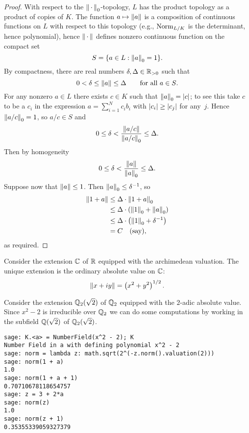 \begin{proof}
With respect to the $\left\|\,\cdot\,\right\|_0$-topology, $L$ has the product topology
as a product of copies of $K$.  The
function $a\mapsto \left\|a\right\|$ is a composition of continuous functions on $L$
with respect to this topology (e.g., $\operatorname{Norm}_{L/K}$ is the determinant, hence
polynomial),
hence $\left\|\,\cdot\,\right\|$ defines nonzero continuous function on the compact set 
$$
 S = \{a \in L : \left\|a\right\|_0 = 1\}.
$$
By compactness, there are  real numbers $\delta,\Delta\in\mathbb{R}_{>0}$ such that 
$$
0 < \delta \leq \left\|a\right\| \leq \Delta \qquad\text{for all $a\in S$}.
$$
For any nonzero $a\in L$ there exists $c\in K$ such that
$\left\|a\right\|_0 = \left|c\right|$; to see this take $c$ to be a $c_i$
in the expression $a=\sum_{i=1}^N c_i b_i$ with $\left|c_i\right|\geq \left|c_j\right|$
for any~$j$.  Hence $\left\|a/c\right\|_0 = 1$, so $a/c\in S$ and
$$
0 \leq \delta < \frac{\left\|a/c\right\|}{\left\|a/c\right\|_0} \leq \Delta.
$$
Then by homogeneity
$$
0 \leq \delta < \frac{\left\|a\right\|}{\left\|a\right\|_0} \leq \Delta.
$$
Suppose now that $\left\|a\right\|\leq 1$.  Then $\left\|a\right\|_0\leq \delta^{-1}$, so 
\begin{align*}
 \left\|1+a\right\| &\leq \Delta\cdot \left\|1+a\right\|_0 \\
  &\leq \Delta\cdot \left( \left\|1\right\|_0 + \left\|a\right\|_0\right)\\
  &\leq \Delta\cdot \left( \left\|1\right\|_0 + \delta^{-1}\right)\\
  &=C \quad\text{(say)},
\end{align*}
as required.
\end{proof}

\begin{example}
Consider the extension $\mathbb{C}$ of $\mathbb{R}$ equipped with the archimedean valuation.
The unique extension is the ordinary absolute value on $\mathbb{C}$:
$$\left\|x+iy\right\| = \left(x^2 + y^2\right)^{1/2}.$$
\end{example}

\begin{example}
Consider the extension $\mathbb{Q}_2(\sqrt{2})$ of $\mathbb{Q}_2$ 
equipped with the $2$-adic absolute value.  
Since $x^2-2$ is irreducible over $\mathbb{Q}_2$ we can do
some computations by working in the subfield $\mathbb{Q}(\sqrt{2})$
of $\mathbb{Q}_2(\sqrt{2})$.
\begin{lstlisting}
sage: K.<a> = NumberField(x^2 - 2); K
Number Field in a with defining polynomial x^2 - 2
sage: norm = lambda z: math.sqrt(2^(-z.norm().valuation(2)))
sage: norm(1 + a)
1.0
sage: norm(1 + a + 1)
0.70710678118654757
sage: z = 3 + 2*a
sage: norm(z)
1.0
sage: norm(z + 1)
0.35355339059327379
\end{lstlisting}

\end{example}

